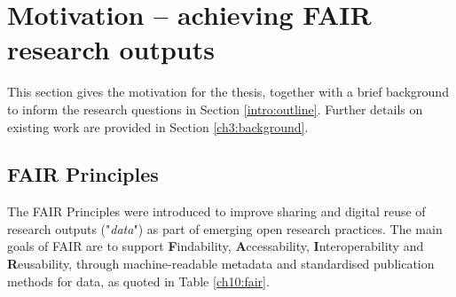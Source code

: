 \section{Motivation -- achieving FAIR research outputs}
\label{ch10:motivation}

This section gives the motivation for the thesis, together with a brief background to inform the  research questions in Section \vref{intro:outline}. Further details on existing work are provided in Section \vref{ch3:background}.

\subsection{FAIR Principles}
\label{ch10:fair-principles}

The \acrshort{FAIR} Principles \cite{Wilkinson 2016} were introduced to improve sharing and digital reuse of research outputs ("\emph{data}") as part of emerging open research practices. The main goals of FAIR are to support \textbf{F}indability, \textbf{A}ccessability, \textbf{I}nteroperability and \textbf{R}eusability, through machine-readable metadata and standardised publication methods for data, as quoted in Table \vref{ch10:fair}.

